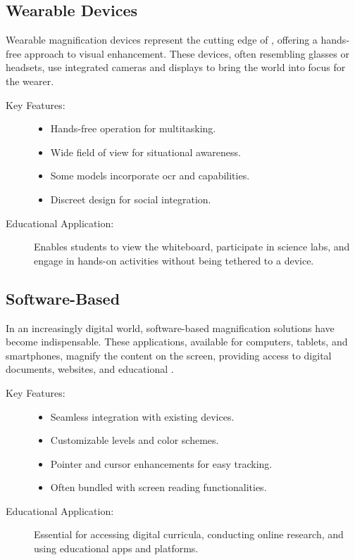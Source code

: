 \subsection{Wearable  Devices}
Wearable magnification devices represent the cutting edge of , offering a hands-free approach to visual enhancement. These devices, often resembling glasses or headsets, use integrated cameras and displays to bring the world into focus for the wearer.\supercite{envision, AFBMagnification}

\begin{description}
	\item[Key Features:]
	      \begin{itemize}
		      \item Hands-free operation for multitasking.
		      \item Wide field of view for situational awareness.
		      \item Some models incorporate \gls{ocr} and  capabilities.
		      \item Discreet design for social integration.
	      \end{itemize}
	\item[Educational Application:] Enables students to view the whiteboard, participate in science labs, and engage in hands-on activities without being tethered to a device.
\end{description}

\subsection{Software-Based }
In an increasingly digital world, software-based magnification solutions have become indispensable. These applications, available for computers, tablets, and smartphones, magnify the content on the screen, providing access to digital documents, websites, and educational .\supercite{BOIAScreenMagnifiers, PerkinsScreenMagnification}

\begin{description}
	\item[Key Features:]
	      \begin{itemize}
		      \item Seamless integration with existing devices.
		      \item Customizable  levels and color schemes.
		      \item Pointer and cursor enhancements for easy tracking.
		      \item Often bundled with screen reading functionalities.
	      \end{itemize}
	\item[Educational Application:] Essential for accessing digital curricula, conducting online research, and using educational apps and platforms.
\end{description}

